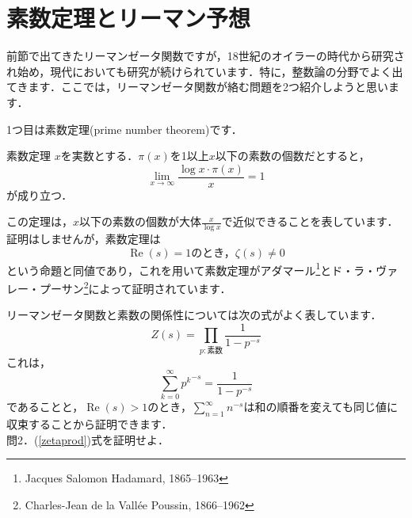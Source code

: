 \documentclass[./main]{subfile}
\begin{document}
\section{素数定理とリーマン予想}

前節で出てきたリーマンゼータ関数ですが，18世紀のオイラーの時代から研究され始め，現代においても研究が続けられています．特に，整数論の分野でよく出てきます．ここでは，リーマンゼータ関数が絡む問題を2つ紹介しようと思います．

1つ目は素数定理(prime number theorem)です．
\begin{itembox}[l]{素数定理}
$x$を実数とする．$\pi(x)$を1以上$x$以下の素数の個数だとすると，
\[
\lim_{x\to\infty}\frac{\log x\cdot\pi (x)}{x}=1
\]
が成り立つ．
\end{itembox}
この定理は，$x$以下の素数の個数が大体$\frac{x}{\log x}$で近似できることを表しています．証明はしませんが，素数定理は
\[
\operatorname{Re}(s)=1\text{のとき，}\zeta(s)\neq 0
\]
という命題と同値であり，これを用いて素数定理がアダマール\footnote{Jacques Salomon Hadamard, 1865--1963}とド・ラ・ヴァレー・プーサン\footnote{Charles-Jean de la Vall\'ee Poussin, 1866--1962}によって証明されています．

リーマンゼータ関数と素数の関係性については次の式がよく表しています．
\begin{equation}\label{zetaprod}
Z(s)=\prod_{p:\text{素数}}\frac{1}{1-p^{-s}}
\end{equation}
これは，
\[
\sum_{k=0}^{\infty}{p^k}^{-s}=\frac{1}{1-p^{-s}}
\]
であることと，$\operatorname{Re}(s)>1$のとき，$\sum_{n=1}^{\infty}n^{-s}$は和の順番を変えても同じ値に収束することから証明できます．\vspace{\baselineskip}\\
問2．(\ref{zetaprod})式を証明せよ．\vspace{\baselineskip}
\end{document}
